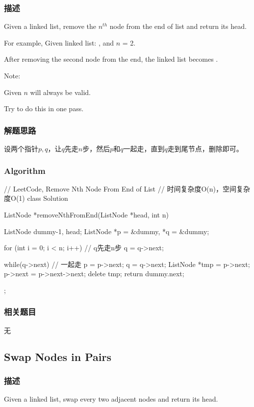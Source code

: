 \subsubsection{描述}
Given a linked list, remove the $n^{th}$ node from the end of list and return 
its head.

For example, Given linked list: , and $n$ = 2.

After removing the second node from the end, the linked list becomes 
.

Note:
\begindot
\item Given $n$ will always be valid.
\item Try to do this in one pass.
\myenddot


\subsubsection{解题思路}
设两个指针$p,q$，让$q$先走$n$步，然后$p$和$q$一起走，直到$q$走到尾节点，删除即可。


\subsubsection{Algorithm}
\begin{Code}
	// LeetCode, Remove Nth Node From End of List
	// 时间复杂度O(n)，空间复杂度O(1)
	class Solution {
		ListNode *removeNthFromEnd(ListNode *head, int n) {
			ListNode dummy{-1, head};
			ListNode *p = &dummy, *q = &dummy;
			
			for (int i = 0; i < n; i++)  // q先走n步
				q = q->next;
			
			while(q->next) { // 一起走
				p = p->next;
				q = q->next;
			}
			ListNode *tmp = p->next;
			p->next = p->next->next;
			delete tmp;
			return dummy.next;
		}
	};
\end{Code}


\subsubsection{相关题目}

\begindot
\item 无
\myenddot


\subsection{Swap Nodes in Pairs}
\label{sec:swap-nodes-in-pairs}


\subsubsection{描述}
Given a linked list, swap every two adjacent nodes and return its head.


